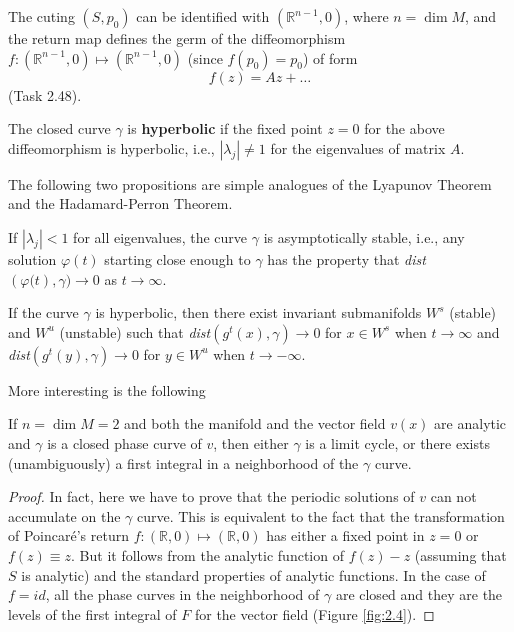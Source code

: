 The cuting $(S, p_0)$ can be identified with $ \left (\mathbb {R} ^ {n-1}, 0 \right)$, where $ n = \dim M $,  and the return map defines the germ of the diffeomorphism $ f: \left (\mathbb {R} ^ {n-1}, 0 \right) \longmapsto \left (\mathbb {R} ^ {n-1}, 0 \right ) $ (since $f(p_{0})=p_{0}$) of form
$$
f(z)=Az+\ldots
$$
(Task 2.48).

\begin{definition}
	The closed curve $ \gamma $ is \textbf{hyperbolic} if the fixed point $ z = 0 $ for the above diffeomorphism is hyperbolic, i.e., $ \left \vert \lambda _ {j} \right \vert \not = 1 $  for the eigenvalues of matrix $ A $.
\end{definition}

The following two propositions are simple analogues of the Lyapunov Theorem and the Hadamard-Perron Theorem.

\begin{proposition}
	If $ \left \vert \lambda _ {j} \right \vert <1 $ for all eigenvalues, the curve $ \gamma $ is asymptotically stable, i.e., any solution $ \varphi (t) $ starting close enough to $ \gamma $ has the property that \emph{dist}$ \left (\varphi (t \right), \gamma) \rightarrow 0 $ as $ t \rightarrow \infty $.
\end{proposition}

\begin{proposition}
	If the curve $ \gamma $ is hyperbolic, then there exist invariant submanifolds $ W ^ {s} $ (stable) and $ W ^ {u} $ (unstable) such that \emph{dist}$ \left (g ^ {t} (x), \gamma \right) \rightarrow 0 $ for $x\in W^{s}$ when $ t \rightarrow \infty $ and \emph{dist}$ \left (g ^ {t} (y), \gamma \right) \rightarrow 0 $ for $ y \in W ^ {u} $ when $ t \rightarrow - \infty $.
\end{proposition}

More interesting is the following

\begin{proposition}
	If $ n = \dim M = 2 $ and both the manifold and the vector field $ v (x) $ are analytic and $ \gamma $ is a closed phase curve of $ v $, then either $\gamma$ is a limit cycle, or there exists (unambiguously) a first integral in a neighborhood of the $ \gamma $ curve.
	\begin{proof}
		In fact, here we have to prove that the periodic solutions of $ v $ can not accumulate on the $ \gamma $ curve. This is equivalent to the fact that the transformation of Poincaré's return $ f: \left (\mathbb {R}, 0 \right) \longmapsto \left (\mathbb {R}, 0 \right) $ has either a fixed point in $z=0$ or $f(z)\equiv z$. But it follows from the analytic function of $ f (z) -z $ (assuming that $ S $ is analytic) and the standard properties of analytic functions.
		In the case of $ f = id $, all the phase curves in the neighborhood of $ \gamma $ are closed and they are the levels of the first integral of $ F $ for the vector field (Figure \ref{fig:2.4}).
	\end{proof}
\end{proposition}

